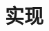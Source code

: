 \documentclass[../main]{subfiles}
\begin{document}
\chapter{实现}%
\label{cha:realize}
\end{document}
